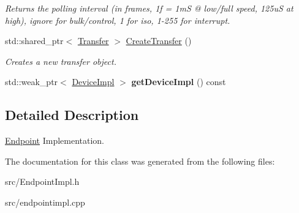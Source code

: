 \begin{DoxyCompactItemize}
\begin{DoxyCompactList}\small\item\em Returns the polling interval (in frames, 1f = 1m\-S @ low/full speed, 125u\-S at high), ignore for bulk/control, 1 for iso, 1-\/255 for interrupt. \end{DoxyCompactList}\item 
\hypertarget{class_lib_u_s_b_1_1_endpoint_impl_a99e5e9786ead8f51ae4ef0d63ff8c327}{std\-::shared\-\_\-ptr$<$ \hyperlink{class_lib_u_s_b_1_1_transfer}{Transfer} $>$ \hyperlink{class_lib_u_s_b_1_1_endpoint_impl_a99e5e9786ead8f51ae4ef0d63ff8c327}{Create\-Transfer} ()}\label{class_lib_u_s_b_1_1_endpoint_impl_a99e5e9786ead8f51ae4ef0d63ff8c327}

\begin{DoxyCompactList}\small\item\em Creates a new transfer object. \end{DoxyCompactList}\item 
\hypertarget{class_lib_u_s_b_1_1_endpoint_impl_a668e441faf10980e5db1f520901dc413}{std\-::weak\-\_\-ptr$<$ \hyperlink{class_lib_u_s_b_1_1_device_impl}{Device\-Impl} $>$ {\bfseries get\-Device\-Impl} () const }\label{class_lib_u_s_b_1_1_endpoint_impl_a668e441faf10980e5db1f520901dc413}

\end{DoxyCompactItemize}


\subsection{Detailed Description}
\hyperlink{class_lib_u_s_b_1_1_endpoint}{Endpoint} Implementation. 

The documentation for this class was generated from the following files\-:\begin{DoxyCompactItemize}
\item 
src/Endpoint\-Impl.\-h\item 
src/endpointimpl.\-cpp\end{DoxyCompactItemize}
